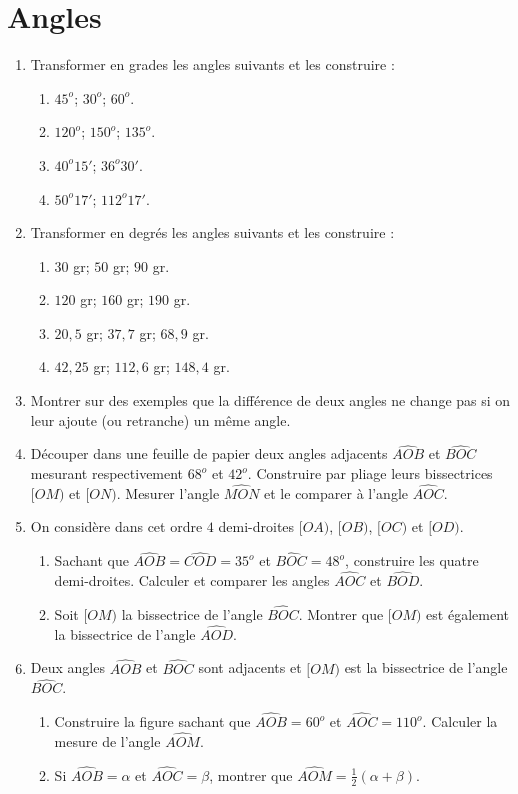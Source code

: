 
\chapter{Angles}  
\begin{enumerate}
\item Transformer en grades les angles suivants et les construire : 
\begin{enumerate}
\item $45^o$; $30^o$; $60^o$. 
\item $120^o$; $150^o$; $135^o$. 
\item $40^o15'$; $36^o30'$.
\item $50^o17'$; $112^o17'$. 
\end{enumerate}
\item Transformer en degrés les angles suivants et les construire : 
\begin{enumerate}
\item $30$ gr; $50$ gr; $90$ gr. 
\item $120$ gr; $160$ gr; $190$ gr. 
\item $20,5$ gr; $37,7$ gr; $68,9$ gr. 
\item $42,25$ gr; $112,6$ gr; $148,4$ gr. 
\end{enumerate} 

\item Montrer sur des exemples que la différence de deux angles ne change pas si on leur ajoute (ou retranche) un même angle.

\item Découper dans une feuille de papier deux angles adjacents $\widehat{AOB}$ et $\widehat{BOC}$ mesurant respectivement $68^o$ et $42^o$. Construire par pliage leurs bissectrices $[OM)$ et $[ON)$. Mesurer l'angle $\widehat{MON}$ et le comparer à l'angle $\widehat{AOC}$. 

\item On considère dans cet ordre $4$ demi-droites $[OA)$, $[OB)$, $[OC)$ et $[OD)$. 
\begin{enumerate}
\item Sachant que $\widehat{AOB}= \widehat{COD} = 35^o$ et $\widehat{BOC}=48^o$, construire les quatre demi-droites. Calculer et comparer les angles $\widehat{AOC}$ et $\widehat{BOD}$. 
\item Soit $[OM)$ la bissectrice de l'angle $\widehat{BOC}$. Montrer que $[OM)$ est également la bissectrice de l'angle $\widehat{AOD}$. 
\end{enumerate}

\item Deux angles $\widehat{AOB}$ et $\widehat{BOC}$ sont adjacents 
et $[OM)$ est la bissectrice de l'angle $\widehat{BOC}$. \begin{enumerate}
\item Construire la figure sachant que $\widehat{AOB}=60^o$ et $\widehat{AOC}= 110^o$. Calculer la mesure de l'angle $\widehat{AOM}$. 
\item Si $\widehat{AOB}= \alpha$ et $\widehat{AOC}= \beta$, montrer que $\widehat{AOM}= \frac12(\alpha + \beta)$. 
\end{enumerate}


\end{enumerate}
